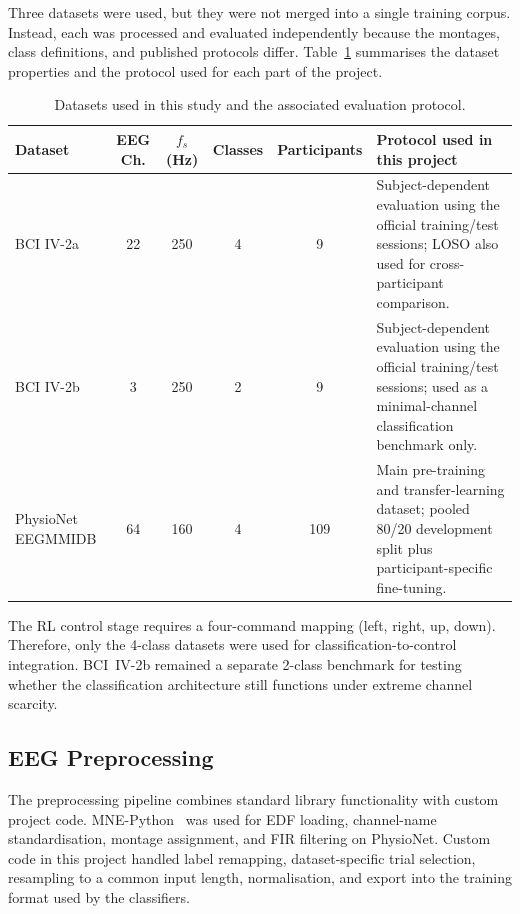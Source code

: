 \documentclass[12pt, a4paper]{article}
\begin{document}
Three datasets were used, but they were not merged into a single training corpus. Instead, each was processed and evaluated independently because the montages, class definitions, and published protocols differ. Table~\ref{tab:datasets_v10} summarises the dataset properties and the protocol used for each part of the project.

\begin{table}[htbp]
\centering
\caption{Datasets used in this study and the associated evaluation protocol.}
\label{tab:datasets_v10}
\begin{tabular}{@{} >{\raggedright\arraybackslash}p{2.5cm} c c c c >{\raggedright\arraybackslash}p{4.3cm} @{}}
\toprule
\textbf{Dataset} & \textbf{EEG Ch.} & \textbf{$f_s$ (Hz)} & \textbf{Classes} & \textbf{Participants} & \textbf{Protocol used in this project} \\
\midrule
BCI IV-2a & 22 & 250 & 4 & 9 & Subject-dependent evaluation using the official training/test sessions; LOSO also used for cross-participant comparison. \\
BCI IV-2b & 3 & 250 & 2 & 9 & Subject-dependent evaluation using the official training/test sessions; used as a minimal-channel classification benchmark only. \\
PhysioNet EEGMMIDB & 64 & 160 & 4 & 109 & Main pre-training and transfer-learning dataset; pooled 80/20 development split plus participant-specific fine-tuning. \\
\bottomrule
\end{tabular}
\end{table}

The RL control stage requires a four-command mapping (left, right, up, down). Therefore, only the 4-class datasets were used for classification-to-control integration. BCI~IV-2b remained a separate 2-class benchmark for testing whether the classification architecture still functions under extreme channel scarcity.

\subsection{EEG Preprocessing}

The preprocessing pipeline combines standard library functionality with custom project code. MNE-Python~\cite{gramfort2013mne} was used for EDF loading, channel-name standardisation, montage assignment, and FIR filtering on PhysioNet. Custom code in this project handled label remapping, dataset-specific trial selection, resampling to a common input length, normalisation, and export into the training format used by the classifiers.
\end{document}
